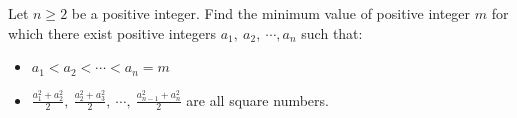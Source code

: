Let $n\geq 2$ be a positive integer. Find the minimum value of positive integer $m$ for which there exist positive integers $a_1,\ a_2,\ \cdots, a_n$ such that:

\begin{itemize}
	\item $a_1 < a_2 < \cdots < a_n = m$
	\item $\frac{a_1^2+a_2^2}{2},\ \frac{a_2^2+a_3^2}{2},\ \cdots,\ \frac{a_{n-1}^2+a_n^2}{2}$ are all square numbers.
\end{itemize}
